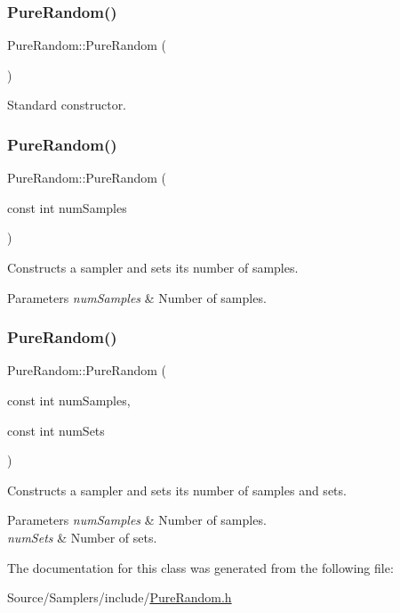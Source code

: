 \subsubsection{\texorpdfstring{Pure\+Random()}{PureRandom()}\hspace{0.1cm}{\footnotesize\ttfamily [1/3]}}
{\footnotesize\ttfamily Pure\+Random\+::\+Pure\+Random (\begin{DoxyParamCaption}{ }\end{DoxyParamCaption})}

Standard constructor. \hypertarget{class_pure_random_a071f6a64e2019dcf303365827707f490}{}\label{class_pure_random_a071f6a64e2019dcf303365827707f490} 
\subsubsection{\texorpdfstring{Pure\+Random()}{PureRandom()}\hspace{0.1cm}{\footnotesize\ttfamily [2/3]}}
{\footnotesize\ttfamily Pure\+Random\+::\+Pure\+Random (\begin{DoxyParamCaption}\item[{const int}]{num\+Samples }\end{DoxyParamCaption})}

Constructs a sampler and sets its number of samples. 
\begin{DoxyParams}{Parameters}
{\em num\+Samples} & Number of samples. \\
\hline
\end{DoxyParams}
\hypertarget{class_pure_random_a32af40bab93939c82bbd59605d5396bd}{}\label{class_pure_random_a32af40bab93939c82bbd59605d5396bd} 
\subsubsection{\texorpdfstring{Pure\+Random()}{PureRandom()}\hspace{0.1cm}{\footnotesize\ttfamily [3/3]}}
{\footnotesize\ttfamily Pure\+Random\+::\+Pure\+Random (\begin{DoxyParamCaption}\item[{const int}]{num\+Samples,  }\item[{const int}]{num\+Sets }\end{DoxyParamCaption})}

Constructs a sampler and sets its number of samples and sets. 
\begin{DoxyParams}{Parameters}
{\em num\+Samples} & Number of samples. \\
\hline
{\em num\+Sets} & Number of sets. \\
\hline
\end{DoxyParams}


The documentation for this class was generated from the following file\+:\begin{DoxyCompactItemize}
\item 
Source/\+Samplers/include/\hyperlink{_pure_random_8h}{Pure\+Random.\+h}\end{DoxyCompactItemize}
